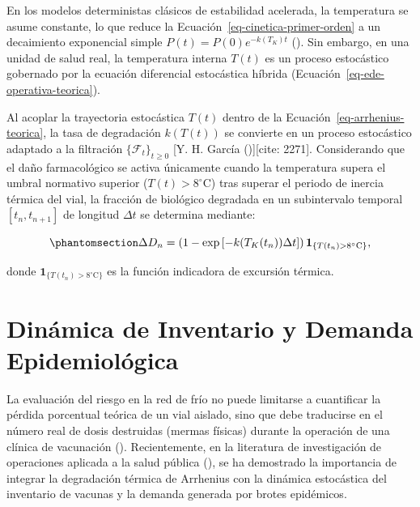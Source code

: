 \documentclass[
  spanish,
  letterpaper,
  DIV=11,
  numbers=noendperiod]{scrreprt}
\theoremstyle{plain}
\theoremstyle{plain}
\theoremstyle{plain}
\theoremstyle{definition}
\theoremstyle{remark}
\begin{document}
En los modelos deterministas clásicos de estabilidad acelerada, la
temperatura se asume constante, lo que reduce la
Ecuación~\ref{eq-cinetica-primer-orden} a un decaimiento exponencial
simple \(P(t) = P(0)e^{-k(T_K)t}\)
(). Sin
embargo, en una unidad de salud real, la temperatura interna \(T(t)\) es
un proceso estocástico gobernado por la ecuación diferencial estocástica
híbrida (Ecuación~\ref{eq-ede-operativa-teorica}).

Al acoplar la trayectoria estocástica \(T(t)\) dentro de la
Ecuación~\ref{eq-arrhenius-teorica}, la tasa de degradación \(k(T(t))\)
se convierte en un proceso estocástico adaptado a la filtración
\(\{\mathcal{F}_t\}_{t \ge 0}\) {[}Y. H. García
(){]}{[}cite: 2271{]}.
Considerando que el daño farmacológico se activa únicamente cuando la
temperatura supera el umbral normativo superior
(\(T(t) > 8^\circ\text{C}\)) tras superar el periodo de inercia térmica
del vial, la fracción de biológico degradada en un subintervalo temporal
\([t_n, t_{n+1}]\) de longitud \(\Delta t\) se determina mediante:

\begin{equation}\phantomsection\label{eq-fraccion-dano-paso}{
\Delta D_n = \left( 1 - \exp\left[ -k(T_K(t_n)) \Delta t \right] \right) \mathbf{1}_{\{T(t_n) > 8^\circ\text{C}\}},
}\end{equation}

donde \(\mathbf{1}_{\{T(t_n) > 8^\circ\text{C}\}}\) es la función
indicadora de excursión térmica.

\section{Dinámica de Inventario y Demanda
Epidemiológica}\label{sec-fundamento-inventario-seir}

La evaluación del riesgo en la red de frío no puede limitarse a
cuantificar la pérdida porcentual teórica de un vial aislado, sino que
debe traducirse en el número real de dosis destruidas (mermas físicas)
durante la operación de una clínica de vacunación
(). Recientemente,
en la literatura de investigación de operaciones aplicada a la salud
pública (), se ha
demostrado la importancia de integrar la degradación térmica de
Arrhenius con la dinámica estocástica del inventario de vacunas y la
demanda generada por brotes epidémicos.
\end{document}
